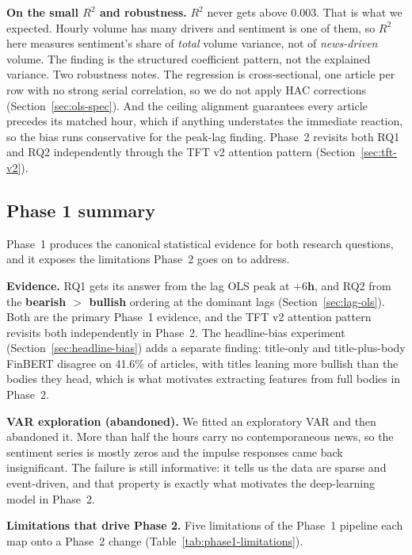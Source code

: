 \textbf{On the small $R^2$ and robustness.} $R^2$ never gets above 0.003. That is what we expected. Hourly volume has many drivers and sentiment is one of them, so $R^2$ here measures sentiment's share of \emph{total} volume variance, not of \emph{news-driven} volume. The finding is the structured coefficient pattern, not the explained variance. Two robustness notes. The regression is cross-sectional, one article per row with no strong serial correlation, so we do not apply HAC corrections (Section~\ref{sec:ols-spec}). And the ceiling alignment guarantees every article precedes its matched hour, which if anything understates the immediate reaction, so the bias runs conservative for the peak-lag finding. Phase~2 revisits both RQ1 and RQ2 independently through the TFT v2 attention pattern (Section~\ref{sec:tft-v2}).

\subsection{Phase 1 summary}\label{sec:var}

Phase~1 produces the canonical statistical evidence for both research questions, and it exposes the limitations Phase~2 goes on to address.

\textbf{Evidence.} RQ1 gets its answer from the lag OLS peak at \textbf{$+6$h}, and RQ2 from the \textbf{bearish $>$ bullish} ordering at the dominant lags (Section~\ref{sec:lag-ols}). Both are the primary Phase~1 evidence, and the TFT v2 attention pattern revisits both independently in Phase~2. The headline-bias experiment (Section~\ref{sec:headline-bias}) adds a separate finding: title-only and title-plus-body FinBERT disagree on 41.6\% of articles, with titles leaning more bullish than the bodies they head, which is what motivates extracting features from full bodies in Phase~2.

\textbf{VAR exploration (abandoned).} We fitted an exploratory VAR and then abandoned it. More than half the hours carry no contemporaneous news, so the sentiment series is mostly zeros and the impulse responses came back insignificant. The failure is still informative: it tells us the data are sparse and event-driven, and that property is exactly what motivates the deep-learning model in Phase~2.

\textbf{Limitations that drive Phase 2.} Five limitations of the Phase~1 pipeline each map onto a Phase~2 change (Table~\ref{tab:phase1-limitations}).

